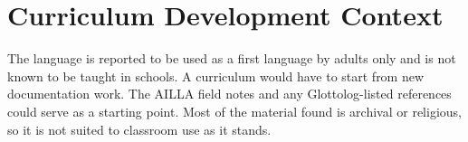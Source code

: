 \documentclass[12pt]{article}
\begin{document}
\section{Curriculum Development Context}
The language is reported to be used as a first language by adults only and is not known to be taught in schools. A curriculum would have to start from new documentation work. The AILLA field notes and any Glottolog-listed references could serve as a starting point. Most of the material found is archival or religious, so it is not suited to classroom use as it stands.
\end{document}
